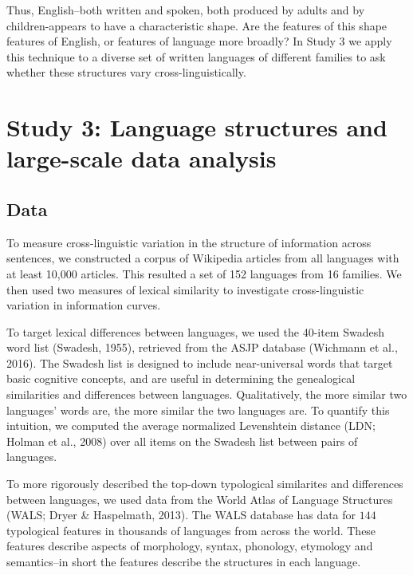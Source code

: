 \documentclass[man,floatsintext]{apa6}
\begin{document}
Thus, English--both written and spoken, both produced by adults and by children-appears to have a characteristic shape. Are the features of this shape features of English, or features of language more broadly? In Study 3 we apply this technique to a diverse set of written languages of different families to ask whether these structures vary cross-linguistically.

\hypertarget{study-3-language-structures-and-large-scale-data-analysis}{%
\section{Study 3: Language structures and large-scale data analysis}\label{study-3-language-structures-and-large-scale-data-analysis}}

\hypertarget{data-2}{%
\subsection{Data}\label{data-2}}

To measure cross-linguistic variation in the structure of information across sentences, we constructed a corpus of Wikipedia articles from all languages with at least 10,000 articles. This resulted a set of 152 languages from 16 families. We then used two measures of lexical similarity to investigate cross-linguistic variation in information curves.

To target lexical differences between languages, we used the 40-item Swadesh word list (Swadesh, 1955), retrieved from the ASJP database (Wichmann et al., 2016). The Swadesh list is designed to include near-universal words that target basic cognitive concepts, and are useful in determining the genealogical similarities and differences between languages. Qualitatively, the more similar two languages' words are, the more similar the two languages are. To quantify this intuition, we computed the average normalized Levenshtein distance (LDN; Holman et al., 2008) over all items on the Swadesh list between pairs of languages.

To more rigorously described the top-down typological similarites and differences between languages, we used data from the World Atlas of Language Structures (WALS; Dryer \& Haspelmath, 2013). The WALS database has data for \(144\) typological features in thousands of languages from across the world. These features describe aspects of morphology, syntax, phonology, etymology and semantics--in short the features describe the structures in each language.
\end{document}
